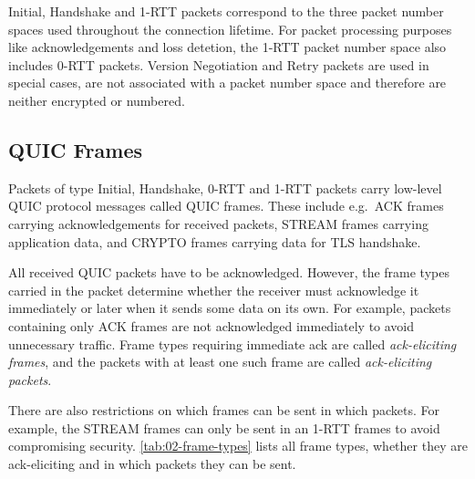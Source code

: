 Initial, Handshake and 1-RTT packets correspond to the three packet number spaces used throughout
the connection lifetime. For packet processing purposes like acknowledgements and loss detetion, the
1-RTT packet number space also includes 0-RTT packets. Version Negotiation and Retry packets are
used in special cases, are not associated with a packet number space and therefore are neither
encrypted or numbered.

\subsection{QUIC Frames}

Packets of type Initial, Handshake, 0-RTT and 1-RTT packets carry low-level QUIC protocol messages
called QUIC frames. These include e.g.\ ACK frames carrying acknowledgements for received packets,
STREAM frames carrying application data, and CRYPTO frames carrying data for TLS handshake.

All received QUIC packets have to be acknowledged. However, the frame types carried in the packet
determine whether the receiver must acknowledge it immediately or later when it sends some data on
its own. For example, packets containing only ACK frames are not acknowledged immediately to avoid
unnecessary traffic. Frame types requiring immediate ack are called \textit{ack-eliciting frames},
and the packets with at least one such frame are called \textit{ack-eliciting packets}.

There are also restrictions on which frames can be sent in which packets. For example, the STREAM
frames can only be sent in an 1-RTT frames to avoid compromising security.
\autoref{tab:02-frame-types} lists all frame types, whether they are ack-eliciting and in which
packets they can be sent.

